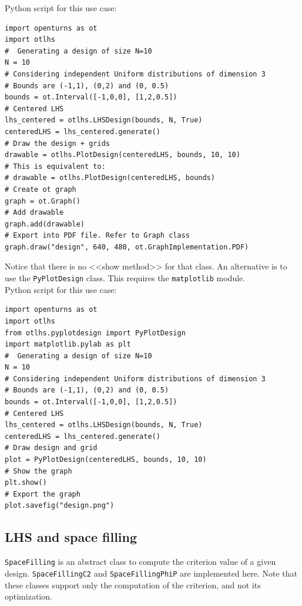 Python script for this use case:

\begin{lstlisting}
import openturns as ot
import otlhs
#  Generating a design of size N=10
N = 10
# Considering independent Uniform distributions of dimension 3
# Bounds are (-1,1), (0,2) and (0, 0.5)
bounds = ot.Interval([-1,0,0], [1,2,0.5])
# Centered LHS
lhs_centered = otlhs.LHSDesign(bounds, N, True)
centeredLHS = lhs_centered.generate()
# Draw the design + grids
drawable = otlhs.PlotDesign(centeredLHS, bounds, 10, 10)
# This is equivalent to:
# drawable = otlhs.PlotDesign(centeredLHS, bounds)
# Create ot graph
graph = ot.Graph()
# Add drawable
graph.add(drawable)
# Export into PDF file. Refer to Graph class
graph.draw("design", 640, 480, ot.GraphImplementation.PDF)
\end{lstlisting}

Notice that there is no <<show method>> for that class. An alternative is to use the \texttt{PyPlotDesign} class.
This requires the \texttt{matplotlib} module.\\

Python script for this use case:

\begin{lstlisting}
import openturns as ot
import otlhs
from otlhs.pyplotdesign import PyPlotDesign
import matplotlib.pylab as plt
#  Generating a design of size N=10
N = 10
# Considering independent Uniform distributions of dimension 3
# Bounds are (-1,1), (0,2) and (0, 0.5)
bounds = ot.Interval([-1,0,0], [1,2,0.5])
# Centered LHS
lhs_centered = otlhs.LHSDesign(bounds, N, True)
centeredLHS = lhs_centered.generate()
# Draw design and grid
plot = PyPlotDesign(centeredLHS, bounds, 10, 10)
# Show the graph
plt.show()
# Export the graph
plot.savefig("design.png")
\end{lstlisting}


\subsection{LHS and space filling}

\texttt{SpaceFilling} is an abstract class to compute the criterion value of a given design. \texttt{SpaceFillingC2} and \texttt{SpaceFillingPhiP} are implemented here.
Note that these classes support only the computation of the criterion, and not its optimization.\\

